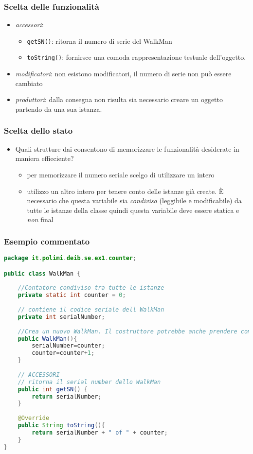\documentclass{article}
\begin{document}
\subsubsection{Scelta delle funzionalit\`a}

\begin{itemize}
\item \emph{accessori}: 
\begin{itemize}
\item \texttt{getSN()}: ritorna il numero di serie del WalkMan
\item \texttt{toString()}:  fornirsce una comoda rappresentazione testuale dell'oggetto.
\end{itemize}
\item \emph{modificatori}: non esistono modificatori, il numero di serie non pu\`o essere cambiato
\item \emph{produttori}: dalla consegna non risulta sia necessario creare un oggetto partendo da una sua istanza.
\end{itemize}


\subsubsection{Scelta dello stato}
\begin{itemize}
\item Quali strutture dai consentono di memorizzare le funzionalit\`a desiderate in maniera effieciente?
\begin{itemize}
\item per memorizzare il numero seriale scelgo di utilizzare un intero
\item utilizzo un altro intero per tenere conto delle istanze gi\`a create. \`E necessario che questa variabile sia \emph{condivisa} (leggibile e modificabile) da tutte le istanze della classe quindi questa variabile deve essere statica e \emph{non} final
\end{itemize}
\end{itemize}



\subsubsection{Esempio commentato}
\begin{lstlisting}[language=Java,escapechar=|]
package it.polimi.deib.se.ex1.counter;

public class WalkMan {
	
	//Contatore condiviso tra tutte le istanze
	private static int counter = 0;
	
	// contiene il codice seriale dell WalkMan
	private int serialNumber;
	
	//Crea un nuovo WalkMan. Il costruttore potrebbe anche prendere come parametro un colore...
	public WalkMan(){
	    serialNumber=counter;
	    counter=counter+1;
	}
	
	// ACCESSORI
	// ritorna il serial number dello WalkMan
	public int getSN() {
		return serialNumber;
	}
	
	@Override
	public String toString(){
		return serialNumber + " of " + counter;
	}
}
\end{lstlisting}
\end{document}
